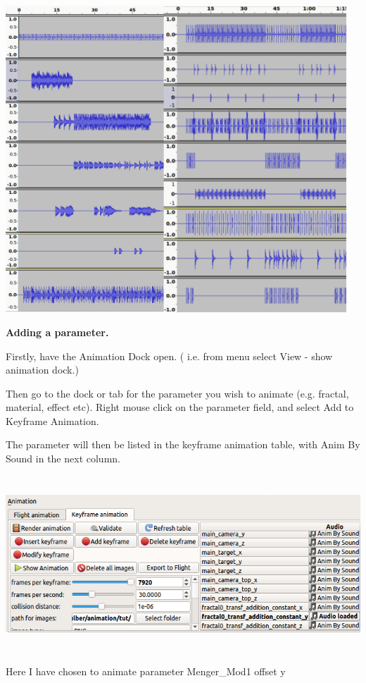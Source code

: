 \includegraphics[width=5.04252in,height=4.53464in]{img/sound/media/image2.png}

\textbf{Adding a parameter.}

Firstly, have the Animation Dock open. ( i.e. from menu select View -
show animation dock.)

Then go to the dock or tab for the parameter you wish to animate (e.g.
fractal, material, effect etc). Right mouse click on the parameter
field, and select Add to Keyframe Animation.

The parameter will then be listed in the keyframe animation table, with
Anim By Sound in the next column.

\includegraphics[width=6.69291in,height=2.59803in]{img/sound/media/image3.png}

Here I have chosen to animate parameter Menger\_Mod1 offset y

